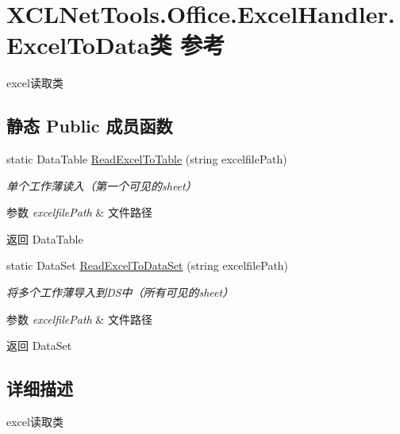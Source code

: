 \hypertarget{class_x_c_l_net_tools_1_1_office_1_1_excel_handler_1_1_excel_to_data}{}\section{X\+C\+L\+Net\+Tools.\+Office.\+Excel\+Handler.\+Excel\+To\+Data类 参考}
\label{class_x_c_l_net_tools_1_1_office_1_1_excel_handler_1_1_excel_to_data}


excel读取类  


\subsection*{静态 Public 成员函数}
\begin{DoxyCompactItemize}
\item 
static Data\+Table \hyperlink{class_x_c_l_net_tools_1_1_office_1_1_excel_handler_1_1_excel_to_data_a1212af867d849c5763dba02910d76ee9}{Read\+Excel\+To\+Table} (string excelfile\+Path)
\begin{DoxyCompactList}\small\item\em 单个工作薄读入（第一个可见的sheet） 
\begin{DoxyParams}{参数}
{\em excelfile\+Path} & 文件路径\\
\hline
\end{DoxyParams}
\begin{DoxyReturn}{返回}
Data\+Table
\end{DoxyReturn}
\end{DoxyCompactList}\item 
static Data\+Set \hyperlink{class_x_c_l_net_tools_1_1_office_1_1_excel_handler_1_1_excel_to_data_a526b1ce8805df33d0dbf8b432b6570cc}{Read\+Excel\+To\+Data\+Set} (string excelfile\+Path)
\begin{DoxyCompactList}\small\item\em 将多个工作薄导入到\+D\+S中（所有可见的sheet） 
\begin{DoxyParams}{参数}
{\em excelfile\+Path} & 文件路径\\
\hline
\end{DoxyParams}
\begin{DoxyReturn}{返回}
Data\+Set
\end{DoxyReturn}
\end{DoxyCompactList}\end{DoxyCompactItemize}


\subsection{详细描述}
excel读取类 



